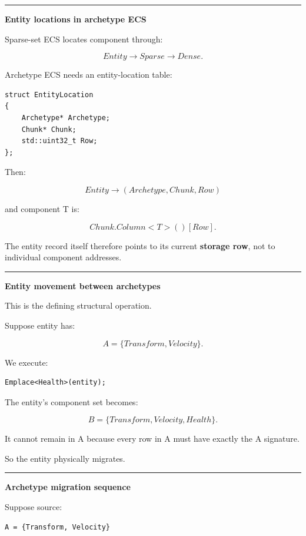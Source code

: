 \begin{center}\rule{0.5\linewidth}{0.5pt}\end{center}

\textbf{Entity locations in archetype ECS}

Sparse-set ECS locates component through:

\[
Entity\rightarrow Sparse\rightarrow Dense.
\]

Archetype ECS needs an entity-location table:

\begin{verbatim}
struct EntityLocation
{
    Archetype* Archetype;
    Chunk* Chunk;
    std::uint32_t Row;
};
\end{verbatim}

Then:

\[
Entity
\rightarrow
(Archetype,Chunk,Row)
\]

and component T is:

\[
Chunk.Column<T>()[Row].
\]

The entity record itself therefore points to its current \textbf{storage row}, not to individual component addresses.

\begin{center}\rule{0.5\linewidth}{0.5pt}\end{center}

\textbf{Entity movement between archetypes}

This is the defining structural operation.

Suppose entity has:

\[
A=\{Transform,Velocity\}.
\]

We execute:

\begin{verbatim}
Emplace<Health>(entity);
\end{verbatim}

The entity's component set becomes:

\[
B=\{Transform,Velocity,Health\}.
\]

It cannot remain in A because every row in A must have exactly the A signature.

So the entity physically migrates.

\begin{center}\rule{0.5\linewidth}{0.5pt}\end{center}

\textbf{Archetype migration sequence}

Suppose source:

\begin{verbatim}
A = {Transform, Velocity}
\end{verbatim}

